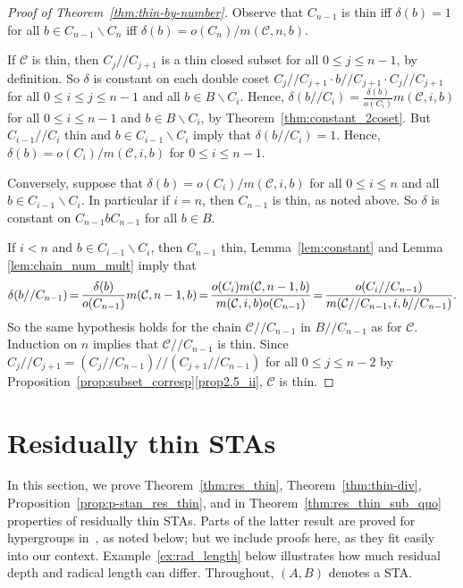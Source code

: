 \documentclass[ALCO,ThmDefs,Unicode,epreuves]{cedram}
\newcommand*{\Mk}{\mkern -2mu}
\begin{document}
\begin{proof} [Proof of Theorem~\ref{thm:thin-by-number}]

Observe that $C_{n-1}$ is thin iff $\delta(b) = 1$ for all $b \in
C_{n-1}\backslash C_n$ iff $\delta(b) =
o(C_n)/m(\mathcal{C}, n, b)$.

If $\mathcal{C}$ is thin, then $C_j//C_{j+1}$ is a thin closed subset
for all $0 \leq j \leq n-1$, by definition. So $\delta$ is constant on
each double coset $C_j//C_{j+1}\cdot b//C_{j+1}\cdot C_j//C_{j+1}$ for
all $0 \leq i \leq j \leq n-1$ and all $b \in B\backslash C_i$. Hence, $\delta(b//C_i) =
\frac{\delta(b)}{o(C_i)}m(\mathcal{C}, i, b)$ for all $0 \leq i \leq
n-1$ and $b \in B\backslash C_i$, by Theorem~\ref{thm:constant_2coset}.
But $C_{i-1}//C_i$ thin and $b \in C_{i-1}\backslash C_i$ imply that
$\delta(b//C_i) = 1$. Hence, $\delta(b) = o(C_i)/m(\mathcal{C},
i, b)$ for $0 \leq i \leq n-1$.

Conversely, suppose that $\delta(b) = o(C_i)/m(\mathcal{C}, i, b)$ for
all $0 \leq i \leq n$ and all $b \in C_{i-1}\backslash C_i$. In
particular if $i = n$, then $C_{n-1}$ is thin, as noted above. So
$\delta$ is constant on $C_{n-1}bC_{n-1}$ for all $b \in B$.

If $i < n$ and $b \in C_{i-1}\backslash C_i$, then $C_{n-1}$ thin, Lemma~\ref{lem:constant} and Lemma
\ref{lem:chain_num_mult} imply that
\[
\delta(b//C_{n-1}) \Mk = \Mk  \frac{\delta(b)}{o(C_{n-1})}m(\mathcal{C}, n-1,
b) \Mk =\Mk  \frac{o(C_i)m(\mathcal{C}, n-1, b)}{m(\mathcal{C}, i, b)o(C_{n-1})}
\Mk =\Mk  \frac{o(C_i//C_{n-1})}{m(\mathcal{C}//C_{n-1}, i, b//C_{n-1})}.
\]
So the same hypothesis holds for the chain $\mathcal{C}//C_{n-1}$ in
$B//C_{n-1}$ as for $\mathcal{C}$. Induction on $n$ implies that
$\mathcal{C}//C_{n-1}$ is thin. Since $C_j//C_{j+1} =
(C_j//C_{n-1})//(C_{j+1}//C_{n-1})$ for all $0 \leq j \leq n-2$ by
Proposition~\ref{prop:subset_corresp}\ref{prop2.5_ii}, $\mathcal{C}$ is thin.
\end{proof}


\section{Residually thin STAs}\label{sect4}


In this section, we prove Theorem~\ref{thm:res_thin}, Theorem~\ref{thm:thin-div}, Proposition~\ref{prop:p-stan_res_thin}, and in
Theorem~\ref{thm:res_thin_sub_quo} 
properties of residually thin STAs. 
 Parts of the latter result are proved for
hypergroups in~\cite {FZ}, as noted below; but we include proofs here,
as they fit easily into our context. Example~\ref{ex:rad_length}
below illustrates how much residual depth and radical length can differ.
Throughout, $(A, B)$ denotes a STA.
\end{document}
